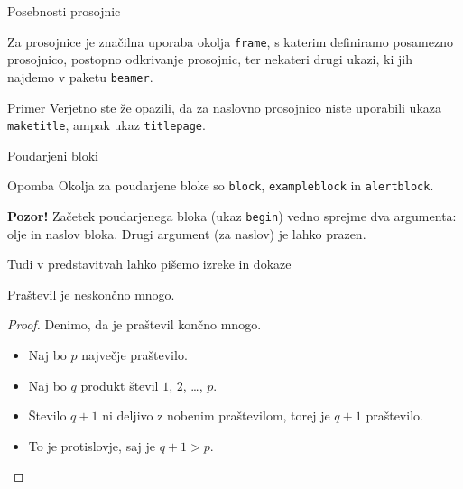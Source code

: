 \begin{frame}{Posebnosti prosojnic}

	Za prosojnice je značilna uporaba okolja \texttt{frame},
	s katerim definiramo posamezno prosojnico, \pause
	postopno odkrivanje prosojnic, \pause
	ter nekateri drugi ukazi, ki jih najdemo v paketu \texttt{beamer}.\pause
	\begin{exampleblock}{Primer}
		Verjetno ste že opazili, da za naslovno prosojnico niste uporabili
		ukaza \texttt{maketitle}, ampak ukaz \texttt{titlepage}.
	\end{exampleblock}
\end{frame}

\begin{frame}{Poudarjeni bloki}


	\begin{exampleblock}{\color{black}Opomba}
			Okolja za poudarjene bloke so \texttt{block}, \texttt{exampleblock} in \texttt{alertblock}.
	\end{exampleblock}
		
	\begin{alertblock}{\textbf{\color{orange}Pozor!}}
		Začetek poudarjenega bloka (ukaz \texttt{begin}) vedno sprejme 
		dva argumenta: olje in naslov bloka.
		Drugi argument (za naslov) je lahko prazen. 
	\end{alertblock}

\end{frame}

\begin{frame}{Tudi v predstavitvah lahko pišemo izreke in dokaze}

	\begin{izrek}
	   Praštevil je neskončno mnogo.
	\end{izrek}
	\begin{proof}
	   Denimo, da je praštevil končno mnogo.
	   \begin{itemize}[<+->]
		  \item Naj bo \(p\) \alert<4>{največje} praštevilo.
		  \item Naj bo \(q\) produkt števil \(1\), \(2\), \ldots, \(p\).
		  \item Število \(q+1\) ni deljivo z nobenim praštevilom, torej je \(q+1\) praštevilo.
		  \item To je protislovje, saj je \(q+1>p\). \qedhere
	   \end{itemize}
	\end{proof}
 \end{frame}
 
